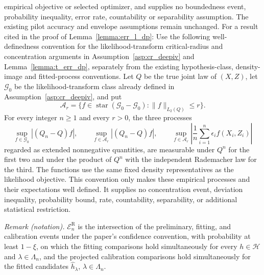 empirical objective or selected optimizer, and supplies no boundedness event, probability inequality, error rate, countability or separability assumption. The existing pilot accuracy and envelope assumptions remain unchanged. For a result cited in the proof of Lemma~\ref{lemma:err_l_dp}: Use the following well-definedness convention for the likelihood-transform critical-radius and concentration arguments in Assumption~\ref{asp:cr_deepiv} and Lemma~\ref{lemma:t_err_dp}, separately from the existing hypothesis-class, density-image and fitted-process conventions. Let $Q$ be the true joint law of $(X,Z)$, let $\mathcal G_0$ be the likelihood-transform class already defined in Assumption~\ref{asp:cr_deepiv}, and put \[ \mathcal A_r=\{f\in\operatorname{star}(\mathcal G_0-\mathcal G_0):\|f\|_{L_2(Q)}\leqslant r\}. \] For every integer $n\geqslant1$ and every $r>0$, the three processes \[ \sup_{f\in\mathcal G_0}|(Q_n-Q)f|,\qquad \sup_{f\in\mathcal A_r}|(Q_n-Q)f|,\qquad \sup_{f\in\mathcal A_r}\left|\frac1n\sum_{i=1}^n\epsilon_i f(X_i,Z_i)\right| \] regarded as extended nonnegative quantities, are measurable under $Q^n$ for the first two and under the product of $Q^n$ with the independent Rademacher law for the third. The functions use the same fixed density representatives as the likelihood objective. This convention only makes these empirical processes and their expectations well defined. It supplies no concentration event, deviation inequality, probability bound, rate, countability, separability, or additional statistical restriction.

\noindent\textit{Remark (notation).} $\mathcal E_n^{\mathrm R}$ is the intersection of the preliminary, fitting, and calibration events under the paper's confidence convention, with probability at least $1-\xi$, on which the fitting comparisons hold simultaneously for every $h\in\mathcal H$ and $\lambda\in\Lambda_n$, and the projected calibration comparisons hold simultaneously for the fitted candidates $\hat h_\lambda$, $\lambda\in\Lambda_n$.

